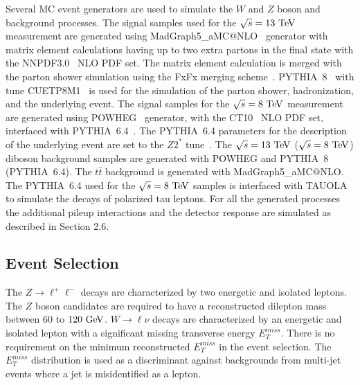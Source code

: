 Several MC event generators are used to simulate the $W$ and $Z$ boson and background processes. The signal samples used for the $\sqrt{s}=13~\mathrm{Te\kern -0.1em V}$ measurement are generated using MadGraph5\_aMC@NLO~\cite{Alwall:2007st} generator with matrix element calculations having up to two extra partons in the final state with the NNPDF3.0~\cite{Ball:2014uwa} NLO PDF set. The matrix element calculation is merged with the parton shower simulation using the FxFx merging scheme~\cite{Frederix:2012ps}. PYTHIA~8~\cite{Sjostrand:2006za,Sjostrand:2014zea}  with tune CUETP8M1~\cite{Skands:2014pea} is used for the simulation of the parton shower, hadronization, and the underlying event.  The signal samples for the $\sqrt{s}=8~\mathrm{Te\kern -0.1em V}$ measurement are generated using POWHEG~\cite{POWHEG-V, POWHEG1, POWHEG2, POWHEG3} generator, with the CT10~\cite{Lai:2010vv} NLO PDF set, interfaced with PYTHIA~6.4~\cite{Sjostrand:2006za}. The PYTHIA~6.4 parameters for the description of the underlying event are set to the $Z2^{*}$ tune~\cite{CMS-PAS-FSQ-12-020}. The  $\sqrt{s}=13~\mathrm{Te\kern -0.1em V}$ ($\sqrt{s}=8~\mathrm{Te\kern -0.1em V}$) diboson background samples are generated with POWHEG and PYTHIA~8 (PYTHIA~6.4). The $t\bar{t}$ background is generated with MadGraph5\_aMC@NLO. The PYTHIA~6.4 used for the  $\sqrt{s}=8~\mathrm{Te\kern -0.1em V}$ samples is interfaced with TAUOLA to simulate the decays of polarized tau leptons. For all the generated processes the additional pileup interactions and the detector response are simulated as described in Section 2.6.

\subsection{Event Selection}

The $Z \rightarrow \ell^{+}\ell^{-}$ decays are characterized by two energetic and isolated leptons. The $Z$ boson candidates are required to have a reconstructed dilepton mass between $60$ to $120~\mathrm{Ge\kern -0.1em V}$. $W \rightarrow \ell \nu$ decays are characterized by an energetic and isolated lepton with a significant missing transverse energy $E_{T}^{miss}$. There is no requirement on the minimum reconstructed $E_{T}^{miss}$ in the event selection. The $E_{T}^{miss}$ distribution is used as a discriminant against backgrounds from multi-jet events where a jet is misidentified as a lepton.

